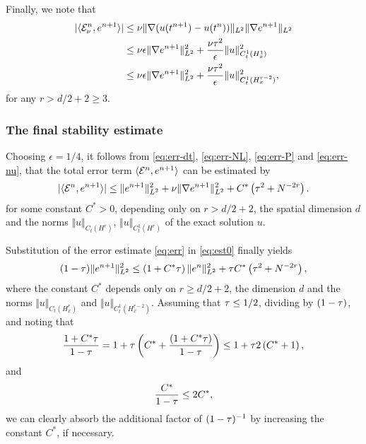 \documentclass[reqno,a4paper]{amsart}
\begin{document}
Finally, we note that 
\begin{align}
|\langle \mathcal{E}^n_{\nu}, e^{n+1}\rangle|
&\le
\nu \Vert \nabla (u(t^{n+1}) - u(t^n))\Vert_{L^2} \Vert \nabla e^{n+1}\Vert_{L^2}
\notag
\\
&\le
\nu \epsilon \Vert \nabla e^{n+1}\Vert_{L^2}^2 + \frac{\nu {\tau}^2}{\epsilon} \Vert u \Vert_{C^1_t(H^1_x)}^2
\notag
\\
&\le
\nu \epsilon \Vert \nabla e^{n+1}\Vert_{L^2}^2 + \frac{\nu {\tau}^2}{\epsilon} \Vert u \Vert_{C^1_t(H^{r-2}_x)}^2, 
\label{eq:err-nu}
\end{align}
for any $r>d/2+2\ge 3$.

\subsubsection{The final stability estimate}
Choosing $\epsilon = 1/4$, it follows from \eqref{eq:err-dt}, \eqref{eq:err-NL}, \eqref{eq:err-P} and \eqref{eq:err-nu}, that the total error term $\langle \mathcal{E}^n, e^{n+1}\rangle$ can be estimated by
\begin{align} \label{eq:err}
|\langle \mathcal{E}^n, e^{n+1}\rangle|
\le
\Vert e^{n+1} \Vert^2_{L^2}
+
\nu \Vert \nabla e^{n+1} \Vert_{L^2}^2
+
C^\ast \left({\tau}^2 + N^{-2r}\right).
\end{align}
for some constant $C^\ast > 0$, depending only on $r > d/2+2$, the spatial dimension $d$ and the norms $\Vert u \Vert_{C_t(H^r)}$, $\Vert u \Vert_{C^1_t(H^r)}$ of the exact solution $u$.

Substitution of the error estimate \eqref{eq:err} in \eqref{eq:est0} finally yields
\begin{align*} 
(1-{\tau}) \Vert e^{n+1} \Vert^2 _{L^2}
\le
\left(
1 + C^\ast {\tau}
\right)
\Vert e^n \Vert^2 _{L^2}
+
{\tau} C^\ast \left( {\tau}^2 + N^{-2r}\right),
\end{align*}
where the constant $C^\ast$ depends only on $r\ge d/2+2$, the dimension $d$ and the norms $\Vert u \Vert_{C_t(H^r_x)}$ and $\Vert u \Vert_{C^1_t(H^{r-2}_x)}$. Assuming that ${\tau} \le 1/2$, dividing by $(1-{\tau})$, and noting that
\[
\frac{1+C^\ast {\tau}}{1-{\tau}}
=
1 + {\tau} \left(C^\ast + \frac{(1+C^\ast {\tau})}{1-{\tau}}\right)
\le
1 + {\tau} 2\left(C^\ast + 1\right),
\]
and
\[
\frac{C^\ast}{1-{\tau}} \le 2C^\ast,
\]
we can clearly absorb the additional factor of $(1-{\tau})^{-1}$ by increasing the constant $C^\ast$, if necessary. 
\end{document}
